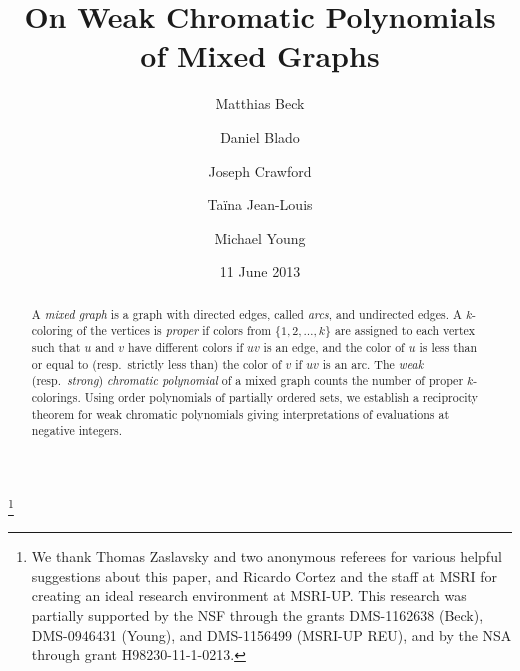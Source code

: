 \documentclass[11pt]{amsart}
\begin{document}
\title{On Weak Chromatic Polynomials of Mixed Graphs}

\author{Matthias Beck}
\address{Department of Mathematics, San Francisco State University, San Francisco, CA 94132, USA}

\author{Daniel Blado}
\address{Department of Computing and Mathematical Sciences, California Institute of Technology, Pasadena CA 91125, USA}

\author{Joseph Crawford}
\address{Department of Mathematics, Morehouse College, Atlanta GA 30314, USA}

\author{Ta\"ina Jean-Louis}
\address{Department of Mathematics, Amherst College, Amherst MA 01002, USA}

\author{Michael Young}
\address{Department of Mathematics, Iowa State University, Ames IA 50011, USA}

\begin{abstract}
A \emph{mixed graph} is a graph with directed edges, called \emph{arcs}, and undirected edges. A $k$-coloring of the vertices is \emph{proper} if
colors from $\{1,2,\ldots,k\}$ are assigned to each vertex such that $u$ and $v$ have different colors if $uv$ is an edge, and the color of $u$ is
less than or equal to (resp.\ strictly less than) the color of $v$ if $uv$ is an arc. The \emph{weak} (resp.\ \emph{strong}) \emph{chromatic
polynomial} of a mixed graph counts the number of proper $k$-colorings. 
Using order polynomials of partially ordered sets, we establish a reciprocity theorem for weak chromatic polynomials giving
interpretations of evaluations at negative integers. 
\end{abstract}



\date{11 June 2013}

\thanks{We thank Thomas Zaslavsky and two anonymous referees for various helpful suggestions about this paper, and 
Ricardo Cortez and the staff at MSRI for creating an ideal research environment at MSRI-UP.
This research was partially supported by the NSF through the grants DMS-1162638 (Beck),
DMS-0946431 (Young), and DMS-1156499 (MSRI-UP REU), and by the NSA through grant H98230-11-1-0213.}
\end{document}
